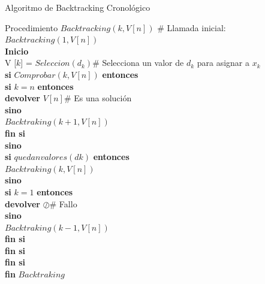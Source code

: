\documentclass[a4paper]{article}
\begin{document}
\begin{algorithm}
	\caption{Algoritmo de Backtracking Cronológico\label{ALG1_3}}
	Procedimiento $Backtracking(k, V [n])$ \# Llamada inicial: $Backtracking(1, V [n])$ \\
	\hspace{0.1cm} \textbf{Inicio}\\
	\hspace{0.1cm} V [$k$] = $Seleccion(d_k)$\hspace{1cm}\# Selecciona un valor de $d_k$ para asignar a $x_k$ \\
	\hspace{0.1cm} \textbf{si} $Comprobar(k, V [n])$ \textbf{entonces}\\
	\hspace{0.6cm} \textbf{si} $k = n$ \textbf{entonces}\\
	\hspace{1.1cm} \textbf{devolver} $V [n]$\hspace{1cm}\# Es una solución\\
	\hspace{0.6cm} \textbf{sino}\\
	\hspace{1.1cm} $Backtraking(k + 1, V [n])$\\
	\hspace{0.6cm} \textbf{fin si}\\
	\hspace{0.1cm} \textbf{sino}\\
	\hspace{0.6cm} \textbf{si} $quedan valores(dk)$ \textbf{entonces}\\
	\hspace{1.1cm} $Backtraking(k, V [n])$\\
	\hspace{0.6cm} \textbf{sino}\\
	\hspace{1.1cm} \textbf{si} $k = 1$ \textbf{entonces}\\
	\hspace{1.6cm} \textbf{devolver} $\oslash$\hspace{1cm}\# Fallo\\
	\hspace{1.1cm} \textbf{sino}\\
	\hspace{1.6cm} $Backtraking(k - 1, V [n])$\\
	\hspace{1.1cm} \textbf{fin si}\\
	\hspace{0.6cm} \textbf{fin si}\\
	\hspace{0.1cm} \textbf{fin si}\\
	\hspace{0.1cm}\textbf{fin} $Backtraking$
\end{algorithm}
\end{document}
